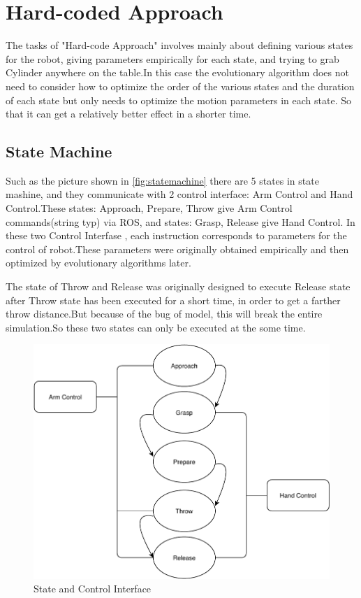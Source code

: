 \section{Hard-coded Approach}
\label{sec:hard-coded}
The tasks of "Hard-code Approach" involves mainly about defining various states for the robot, giving parameters empirically for each state, and trying to grab Cylinder anywhere on the table.In this case the evolutionary algorithm does not need to consider how to optimize the order of the various states and the duration of each state but only needs to optimize the motion parameters in each state. So that it can get a relatively better effect in a shorter time.

\subsection{State Machine}

Such as the picture shown in \autoref{fig:statemachine} there are 5 states in state mashine, and they communicate with 2 control interface: Arm Control and Hand Control.These states: Approach, Prepare, Throw give Arm Control commands(string typ) via ROS, and states: Grasp, Release give Hand Control. In these two Control Interfase , each instruction corresponds to parameters for the control of robot.These parameters were originally obtained empirically and then optimized by evolutionary algorithms later. 

The state of Throw and Release was originally designed to execute Release state after Throw state has been executed for a short time, in order to get a farther throw distance.But because of the bug of model, this will break the entire simulation.So these two states can only be executed at the some time. 

\begin{figure}[tpb]
\centering
	\includegraphics[width=0.96\linewidth]{figures/state.pdf} 
	\caption{State and Control Interface}
	\vspace{-0.4cm}
	\label{fig:statemachine}
\end{figure}

